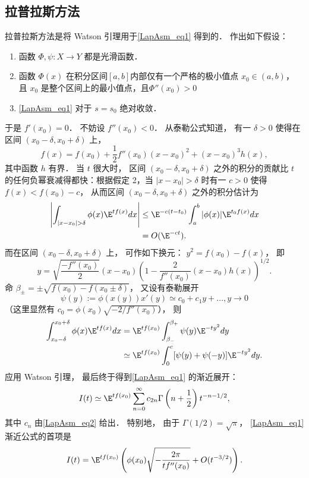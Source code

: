 \subsection{拉普拉斯方法}
拉普拉斯方法是将 Watson 引理用于\autoref{LapAsm_eq1} 得到的． 作出如下假设：

\begin{enumerate}
\item 函数 $\Phi,\psi:X\to Y$ 都是光滑函数．

\item 函数 $\Phi(x)$ 在积分区间$[a,b]$内部仅有一个严格的极小值点 $x_0\in(a,b)$， 且 $x_0$ 是整个区间上的最小值点，且$\Phi''(x_0)>0$

\item \autoref{LapAsm_eq1} 对于 $s=s_0$ 绝对收敛．
\end{enumerate}

于是 $f'(x_0)=0$． 不妨设 $f''(x_0)<0$． 从泰勒公式知道， 有一 $\delta>0$ 使得在区间 $(x_0-\delta,x_0+\delta)$ 上， 
$$
f(x)=f(x_0)+\frac{1}{2}f''(x_0)(x-x_0)^2+(x-x_0)^3h(x),
$$
其中函数 $h$ 有界． 当 $t$ 很大时， 区间 $(x_0-\delta,x_0+\delta)$ 之外的积分的贡献比 $t$ 的任何负幂衰减得都快：根据假定 2，当 $|x-x_0|>\delta$ 时有一 $c>0$ 使得 $f(x)<f(x_0)-c$， 从而区间 $(x_0-\delta,x_0+\delta)$ 之外的积分估计为
$$
\begin{aligned}
\left|\int_{|x-x_0|>\delta}\phi(x)\E^{tf(x)}dx\right|
&\leq \E^{-c(t-t_0)}\int_a^b|\phi(x)|\E^{t_0f(x)}dx\\
&=O(\E^{-ct}).
\end{aligned}
$$
而在区间 $(x_0-\delta,x_0+\delta)$ 上， 可作如下换元： $y^2=f(x_0)-f(x)$， 即
$$
y=\sqrt{\frac{-f''(x_0)}{2}}(x-x_0)\left(1-\frac{2}{f''(x_0)}(x-x_0)h(x)\right)^{1/2}.
$$
命 $\beta_{\pm}=\pm\sqrt{f(x_0)-f(x_0\pm\delta)}$， 又设有泰勒展开
\begin{equation}\label{LapAsm_eq2}
\psi(y):=\phi(x(y))x'(y)\simeq c_0+c_1y+...,y\to 0
\end{equation}
（这里显然有 $c_0=\phi(x_0)\sqrt{-2/f''(x_0)}$）， 则
$$
\begin{aligned}
\int_{x_0-\delta}^{x_0+\delta}\phi(x)\E^{tf(x)}dx
&=\E^{tf(x_0)}\int_{\beta_{-}}^{\beta_+}\psi(y)\E^{-ty^2}dy\\
&\simeq\E^{tf(x_0)}\int_{0}^{c}[\psi(y)+\psi(-y)]\E^{-ty^2}dy.
\end{aligned}
$$
应用 Watson 引理， 最后终于得到\autoref{LapAsm_eq1} 的渐近展开：
\begin{equation}\label{LapAsm_eq3}
I(t)\simeq \E^{tf(x_0)}\sum_{n=0}^\infty c_{2n}\Gamma\left(n+\frac{1}{2}\right)t^{-n-1/2},
\end{equation}
其中 $c_n$ 由\autoref{LapAsm_eq2} 给出． 特别地， 由于 $\Gamma(1/2)=\sqrt{\pi}$， \autoref{LapAsm_eq1} 渐近公式的首项是
$$
I(t)=\E^{tf(x_0)}\left(\phi(x_0)\sqrt{-\frac{2\pi}{tf''(x_0)}}+O(t^{-3/2})\right).
$$

